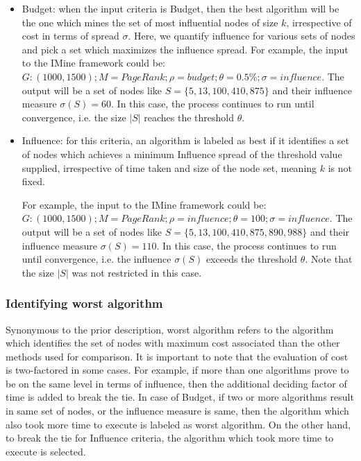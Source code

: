 			\begin{itemize}
				\item Budget: when the input criteria is Budget, then the best algorithm will be the one which mines the set of most influential nodes of size $k$, irrespective of cost in terms of spread $\sigma$. Here, we quantify influence for various sets of nodes and pick a set which maximizes the influence spread. For example, the input to the IMine framework could be: $G:(1000,1500); M=PageRank; \rho=budget; \theta =0.5\%; \sigma=influence$. The output will be a set of nodes like $S=\{5,13,100,410,875\}$ and their influence measure $\sigma(S)=60$. In this case, the process continues to run until convergence, i.e. the size $|S|$ reaches the threshold $\theta$.
				
				\item Influence: for this criteria, an algorithm is labeled as best if it identifies a set of nodes which achieves a minimum Influence spread of the threshold value supplied, irrespective of time taken and size of the node set, meaning $k$ is not fixed.
				
				For example, the input to the IMine framework could be: $G:(1000,1500); M=PageRank; \rho=influence; \theta=100; \sigma=influence$. The output will be a set of nodes like $S=\{5,13,100,410,875,890,988\}$ and their influence measure $\sigma(S)=110$. In this case, the process continues to run until convergence, i.e. the influence $\sigma(S)$ exceeds the threshold $\theta$. Note that the size $|S|$ was not restricted in this case.
			\end{itemize}
			
			\subsubsection{Identifying worst algorithm}
			Synonymous to the prior description, worst algorithm refers to the algorithm which identifies the set of nodes with maximum cost associated than the other methods used for comparison. It is important to note that the evaluation of cost is two-factored in some cases. For example, if more than one algorithms prove to be on the same level in terms of influence, then the additional deciding factor of time is added to break the tie. In case of Budget, if two or more algorithms result in same set of nodes, or the influence measure is same, then the algorithm which also took more time to execute is labeled as worst algorithm. On the other hand, to break the tie for Influence criteria, the algorithm which took more time to execute is selected.
	

